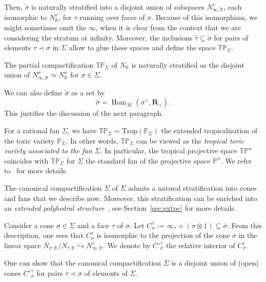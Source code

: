 \documentclass[11pt]{amsart}
\theoremstyle{definition}
\newenvironment{remark}
  {\pushQED{\qed}\renewcommand{\qedsymbol}{$\diamond$}\remm}
  {\popQED\endremm}
\numberwithin{equation}{section}
\renewcommand{\~}{\widetilde}
\newcommand{\R}{\mathbb{R}}
\newcommand{\rquot}[2]{#1\big/#2}
\DeclareMathOperator{\Hom}{Hom} %
\newcommand{\tm}{\mathscr{M}} %
\newcommand{\eR}{\mathbf R} %
\newcommand{\C}{{C^\circ}} %
\renewcommand{\P}{\mathbb P} %
\newcommand{\TP}{\mathbb{TP}} %
\newcommand{\comp}[1]{\overline{#1}} %
\newcommand{\subface}{\prec}
\begin{document}
Then, $\~\sigma$ is naturally stratified into a disjoint union of subspaces $N^\tau_{\infty,\R}$, each isomorphic to $N^\tau_\R$, for $\tau$ running over faces of $\sigma$. Because of this isomorphism, we might sometimes omit the $\infty$, when it is clear from the context that we are considering the stratum at infinity. Moreover, the inclusions $\~\tau\subseteq\~\sigma$ for pairs of elements $\tau \subface \sigma$ in $\Sigma$ allow to glue these spaces and define the space $\TP_\Sigma$.

The partial compactification $\TP_\Sigma$ of $N_\R$ is naturally stratified as the disjoint union of $N^\sigma_{\infty,\R} \simeq N^{\sigma}_\R$ for $\sigma \in \Sigma$.

\begin{remark}[Remark \ref{rem:definition_dual} continued] We can also define $\~\sigma$ as a set by
\[ \~\sigma = \Hom_\tm(\sigma^\vee, \eR_+). \]
This justifies the discussion of the next paragraph.
\end{remark}

For a rational fan $\Sigma$, we have $\TP_\Sigma = \mathrm{Trop}(\P_\Sigma)$ the extended tropicalization of the toric variety $\P_\Sigma$. In other words, $\TP_\Sigma$ can be viewed as the \emph{tropical toric variety associated to the fan $\Sigma$}. In particular, the tropical projective space $\TP^n$ coincides with $\TP_\Sigma$ for $\Sigma$ the standard fan of the projective space $\P^n$. We refer to~\cites{AP, BGJK, Kaj, Payne, Thuillier} for more details.

\medskip

The canonical compactification $\comp\Sigma$ of $\Sigma$ admits a natural stratification into cones and fans that we describe now. Moreover, this stratification can be enriched into an \emph{extended polyhedral structure}~\cite{AP-geom}, see Section~\ref{sec:extpc} for more details.

Consider a cone $\sigma \in \Sigma$ and a face $\tau$ of $\sigma$. Let $C^\tau_\sigma:=\infty_\tau+(\sigma\otimes 1) \subseteq \comp\sigma$. From this description, one sees that $C^\tau_\sigma$ is isomorphic to the projection of the cone $\sigma$ in the linear space $\rquot{N_{\sigma, \mathbb R}}{N_{\tau, \mathbb R}} \hookrightarrow N^{\tau}_{\infty,\R}$. We denote by $\C^\tau_\sigma$ the relative interior of $C^\tau_\sigma$.

One can show that the canonical compactification $\comp \Sigma$ is a disjoint union of (open) cones $\C^\tau_\sigma$ for pairs $\tau\subface\sigma$ of elements of $\Sigma$.
\end{document}
